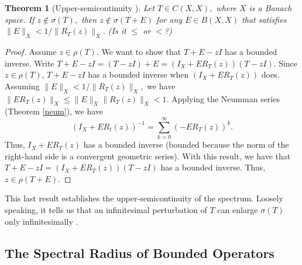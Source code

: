 \documentclass[12pt,a4paper]{article}
\theoremstyle{boldthm}
\newtheorem{theorem}{Theorem}[section]
\theoremstyle{bolddefn}
\begin{document}
\begin{theorem}[Upper-semicontinuity \cite{Nick}]
    Let $T \in C(X, X),$ where $X$ is a Banach space. If $z \notin \sigma(T),$ then $z \notin \sigma(T + E)$ for any $E \in B(X, X)$ that satisfies $\| E \|_{X} < 1/\|R_T(z)\|_{X}.$ (Is it $\le$ or $<$?)
\end{theorem}
\begin{proof}
    Assume $z\in \rho(T).$ We want to show that $T + E - zI$ has a bounded inverse. Write $T + E - zI = (T-zI) + E = (I_X + E R_T(z)) (T-zI).$ Since $z \in \rho(T)$, $T+E-zI$ has a bounded inverse when $(I_X + E R_T(z))$ does. Assuming $\| E \|_{X} < 1/\|R_T(z)\|_{X},$ we have $\| E R_T(z) \|_{X} \le \|E\|_X \|R_T(z)\|_X < 1.$ Applying the Neumman series (Theorem \ref{neum}), we have 
    \begin{equation}
        (I_X + E R_t(z))^{-1} = \sum_{k=0}^{\infty} (-E R_T(z))^k.
    \end{equation}
    Thus, $I_X + E R_T(z)$ has a bounded inverse (bounded because the norm of the right-hand side is a convergent geometric series). With this result, we have that $T + E - zI = (I_X + E R_T(z)) (T-zI)$ has a bounded inverse. Thus, $z \in \rho(T+E).$ 
\end{proof}
This last result establishes the upper-semicontinuity of the spectrum. Loosely speaking, it tells us that an infinitesimal perturbation of $T$ can enlarge $\sigma(T)$ only infinitesimally \cite{Nick}.


\subsection{The Spectral Radius of Bounded Operators}
\end{document}
